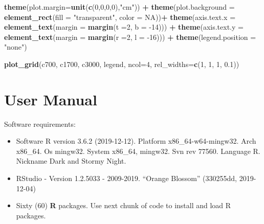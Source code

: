 \documentclass[12pt,twoside]{reedthesis}
\newenvironment{Shaded}{\begin{snugshade}}{\end{snugshade}}
\newcommand{\DataTypeTok}[1]{\textcolor[rgb]{0.13,0.29,0.53}{#1}}
\newcommand{\DecValTok}[1]{\textcolor[rgb]{0.00,0.00,0.81}{#1}}
\newcommand{\FloatTok}[1]{\textcolor[rgb]{0.00,0.00,0.81}{#1}}
\newcommand{\KeywordTok}[1]{\textcolor[rgb]{0.13,0.29,0.53}{\textbf{#1}}}
\newcommand{\NormalTok}[1]{#1}
\newcommand{\OperatorTok}[1]{\textcolor[rgb]{0.81,0.36,0.00}{\textbf{#1}}}
\newcommand{\OtherTok}[1]{\textcolor[rgb]{0.56,0.35,0.01}{#1}}
\newcommand{\StringTok}[1]{\textcolor[rgb]{0.31,0.60,0.02}{#1}}
\providecommand{\tightlist}{%
  \setlength{\itemsep}{0pt}\setlength{\parskip}{0pt}}
\begin{document}
\begin{Shaded}
\begin{Highlighting}[]
\StringTok{  }\KeywordTok{theme}\NormalTok{(}\DataTypeTok{plot.margin=}\KeywordTok{unit}\NormalTok{(}\KeywordTok{c}\NormalTok{(}\DecValTok{0}\NormalTok{,}\DecValTok{0}\NormalTok{,}\DecValTok{0}\NormalTok{,}\DecValTok{0}\NormalTok{),}\StringTok{"cm"}\NormalTok{)) }\OperatorTok{+}
\StringTok{  }\KeywordTok{theme}\NormalTok{(}\DataTypeTok{plot.background =} \KeywordTok{element_rect}\NormalTok{(}\DataTypeTok{fill =} \StringTok{"transparent"}\NormalTok{, }\DataTypeTok{color =} \OtherTok{NA}\NormalTok{))}\OperatorTok{+}
\StringTok{  }\KeywordTok{theme}\NormalTok{(}\DataTypeTok{axis.text.x =} \KeywordTok{element_text}\NormalTok{(}\DataTypeTok{margin =}  \KeywordTok{margin}\NormalTok{(}\DataTypeTok{t =}\DecValTok{2}\NormalTok{, }\DataTypeTok{b =} \DecValTok{-14}\NormalTok{))) }\OperatorTok{+}\StringTok{ }
\StringTok{  }\KeywordTok{theme}\NormalTok{(}\DataTypeTok{axis.text.y =} \KeywordTok{element_text}\NormalTok{(}\DataTypeTok{margin =}  \KeywordTok{margin}\NormalTok{(}\DataTypeTok{r =}\DecValTok{2}\NormalTok{, }\DataTypeTok{l =} \DecValTok{-16}\NormalTok{))) }\OperatorTok{+}
\StringTok{  }\KeywordTok{theme}\NormalTok{(}\DataTypeTok{legend.position =} \StringTok{"none"}\NormalTok{)}

\KeywordTok{plot_grid}\NormalTok{(c700, c1700, c3000, legend, }\DataTypeTok{ncol=}\DecValTok{4}\NormalTok{, }\DataTypeTok{rel_widths=}\KeywordTok{c}\NormalTok{(}\DecValTok{1}\NormalTok{, }\DecValTok{1}\NormalTok{, }\DecValTok{1}\NormalTok{, }\FloatTok{0.1}\NormalTok{))}
\end{Highlighting}
\end{Shaded}
\normalsize

\hypertarget{manual}{%
\chapter{User Manual}\label{manual}}

Software requirements:
\begin{itemize}
\tightlist
\item
  Software R version 3.6.2 (2019-12-12). Platform x86\_64-w64-mingw32. Arch x86\_64. Os mingw32. System x86\_64, mingw32. Svn rev 77560. Language R. Nickname Dark and Stormy Night.
\item
  RStudio - Version 1.2.5033 - 2009-2019. ``Orange Blossom'' (330255dd, 2019-12-04)
\item
  Sixty (60) \textbf{R} packages. Use next chunk of code to install and load R packages.
\end{itemize}
\tiny
\end{document}
